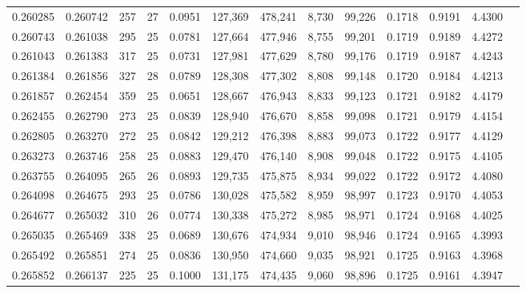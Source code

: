 \begin{tabular}{rrrrrrrrrrrrr}
0.260285 & 0.260742 &   257 &  27 &                                     0.0951 & 127,369 & 478,241 &   8,730 &  99,226 & 0.1718 & 0.9191 & 4.4300 \\
0.260743 & 0.261038 &   295 &  25 &                                     0.0781 & 127,664 & 477,946 &   8,755 &  99,201 & 0.1719 & 0.9189 & 4.4272 \\
0.261043 & 0.261383 &   317 &  25 &                                     0.0731 & 127,981 & 477,629 &   8,780 &  99,176 & 0.1719 & 0.9187 & 4.4243 \\
0.261384 & 0.261856 &   327 &  28 &                                     0.0789 & 128,308 & 477,302 &   8,808 &  99,148 & 0.1720 & 0.9184 & 4.4213 \\
0.261857 & 0.262454 &   359 &  25 &                                     0.0651 & 128,667 & 476,943 &   8,833 &  99,123 & 0.1721 & 0.9182 & 4.4179 \\
0.262455 & 0.262790 &   273 &  25 &                                     0.0839 & 128,940 & 476,670 &   8,858 &  99,098 & 0.1721 & 0.9179 & 4.4154 \\
0.262805 & 0.263270 &   272 &  25 &                                     0.0842 & 129,212 & 476,398 &   8,883 &  99,073 & 0.1722 & 0.9177 & 4.4129 \\
0.263273 & 0.263746 &   258 &  25 &                                     0.0883 & 129,470 & 476,140 &   8,908 &  99,048 & 0.1722 & 0.9175 & 4.4105 \\
0.263755 & 0.264095 &   265 &  26 &                                     0.0893 & 129,735 & 475,875 &   8,934 &  99,022 & 0.1722 & 0.9172 & 4.4080 \\
0.264098 & 0.264675 &   293 &  25 &                                     0.0786 & 130,028 & 475,582 &   8,959 &  98,997 & 0.1723 & 0.9170 & 4.4053 \\
0.264677 & 0.265032 &   310 &  26 &                                     0.0774 & 130,338 & 475,272 &   8,985 &  98,971 & 0.1724 & 0.9168 & 4.4025 \\
0.265035 & 0.265469 &   338 &  25 &                                     0.0689 & 130,676 & 474,934 &   9,010 &  98,946 & 0.1724 & 0.9165 & 4.3993 \\
0.265492 & 0.265851 &   274 &  25 &                                     0.0836 & 130,950 & 474,660 &   9,035 &  98,921 & 0.1725 & 0.9163 & 4.3968 \\
0.265852 & 0.266137 &   225 &  25 &                                     0.1000 & 131,175 & 474,435 &   9,060 &  98,896 & 0.1725 & 0.9161 & 4.3947 \\

\end{tabular}
